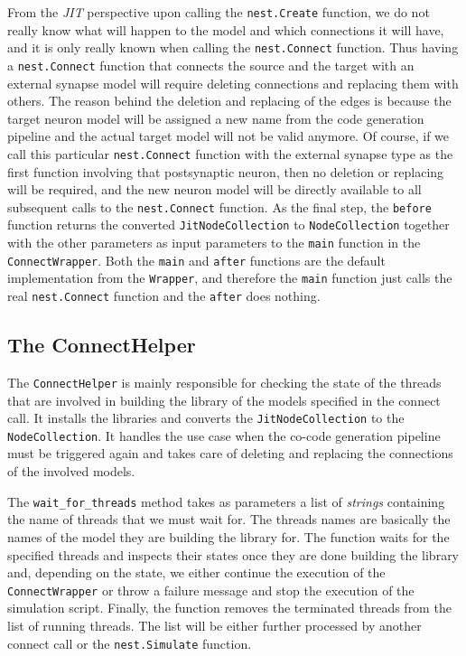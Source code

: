 From the \emph{JIT} perspective upon calling the \texttt{nest.Create} function, we do not really know what will happen to the model and which connections it will have, and it is only really known when calling the \texttt{nest.Connect} function. Thus having a \texttt{nest.Connect} function that connects the source and the target with
an external synapse model will require deleting connections and replacing them with others. The reason behind the deletion and replacing of the edges is because the target neuron model will be assigned a new name from the code generation pipeline and the actual target model will not be valid anymore. Of course, if we call this particular  \texttt{nest.Connect} function with the external synapse type as the first function involving that postsynaptic neuron, then no deletion or replacing will be required, and the new neuron model will be directly available to all subsequent calls to the \texttt{nest.Connect} function. As the final step, the \texttt{before} function returns the converted \texttt{JitNodeCollection} to \texttt{NodeCollection} together with the other parameters as input parameters to the \texttt{main} function in the \texttt{ConnectWrapper}. Both the \texttt{main} and \texttt{after} functions are the default implementation from the \texttt{Wrapper}, and therefore the \texttt{main} function just calls the real \texttt{nest.Connect} function and the \texttt{after} does nothing.


\subsection{The ConnectHelper}


The \texttt{ConnectHelper} is mainly responsible for checking the state of the threads that are involved in building the library of the models specified in the connect call. It installs the libraries and converts the \texttt{JitNodeCollection} to the \texttt{NodeCollection}. It handles the use case when the co-code generation pipeline must be triggered again and takes care of deleting and replacing the connections of the involved models.


The \texttt{wait\_for\_threads} method takes as parameters a list of \emph{strings} containing the name of threads that we must wait for. The threads names are basically the names of the model they are building the library for. The function waits for the specified threads and inspects their states once they are done building the library and, depending on the state, we either continue the execution of the \texttt{ConnectWrapper} or throw a failure message and stop the execution of the simulation script. Finally, the function removes the terminated threads from the list of running threads. The list will be either further processed by another connect call or the \texttt{nest.Simulate} function.

